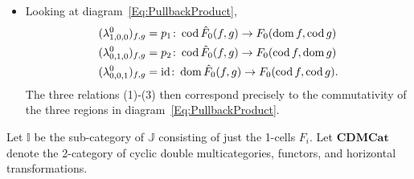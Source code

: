 \begin{example}
\begin{itemize}
	\item Looking at diagram~\eqref{Eq:PullbackProduct}, 
	\begin{align*}
		(\lambda^0_{1,0,0})_{f,g}&=p_1\colon \operatorname{cod}\hat{F}_0(f,g)\to F_0(\operatorname{dom} f,\operatorname{cod} g)\\
		(\lambda^0_{0,1,0})_{f,g}&=p_2\colon \operatorname{cod}\hat{F}_0(f,g)\to F_0(\operatorname{cod} f,\operatorname{dom} g)\\
		(\lambda^0_{0,0,1})_{f,g}&=\operatorname{id}\colon \operatorname{dom}\hat{F}_0(f,g)\to F_0(\operatorname{cod} f,\operatorname{cod} g).
	\end{align*}
	The three relations (1)-(3) then correspond precisely to the commutativity of the three regions in diagram~\eqref{Eq:PullbackProduct}.
\end{itemize}
\end{example}


Let $\mathbb{I}$ be the sub-category of $\mathbb{J}$ consisting of just the 1-cells $F_i$. Let $\mathbf{CDMCat}$ denote the 2-category of cyclic double multicategories, functors, and horizontal transformations.

